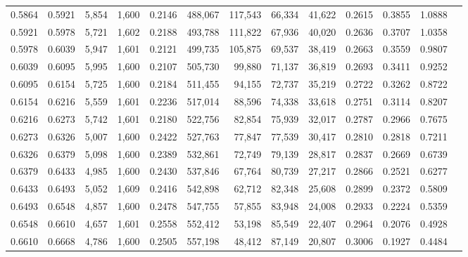 \begin{tabular}{rrrrrrrrrrrrr}
0.5864 & 0.5921 &  5,854 & 1,600 &                                     0.2146 & 488,067 & 117,543 &  66,334 &  41,622 & 0.2615 & 0.3855 & 1.0888 \\
0.5921 & 0.5978 &  5,721 & 1,602 &                                     0.2188 & 493,788 & 111,822 &  67,936 &  40,020 & 0.2636 & 0.3707 & 1.0358 \\
0.5978 & 0.6039 &  5,947 & 1,601 &                                     0.2121 & 499,735 & 105,875 &  69,537 &  38,419 & 0.2663 & 0.3559 & 0.9807 \\
0.6039 & 0.6095 &  5,995 & 1,600 &                                     0.2107 & 505,730 &  99,880 &  71,137 &  36,819 & 0.2693 & 0.3411 & 0.9252 \\
0.6095 & 0.6154 &  5,725 & 1,600 &                                     0.2184 & 511,455 &  94,155 &  72,737 &  35,219 & 0.2722 & 0.3262 & 0.8722 \\
0.6154 & 0.6216 &  5,559 & 1,601 &                                     0.2236 & 517,014 &  88,596 &  74,338 &  33,618 & 0.2751 & 0.3114 & 0.8207 \\
0.6216 & 0.6273 &  5,742 & 1,601 &                                     0.2180 & 522,756 &  82,854 &  75,939 &  32,017 & 0.2787 & 0.2966 & 0.7675 \\
0.6273 & 0.6326 &  5,007 & 1,600 &                                     0.2422 & 527,763 &  77,847 &  77,539 &  30,417 & 0.2810 & 0.2818 & 0.7211 \\
0.6326 & 0.6379 &  5,098 & 1,600 &                                     0.2389 & 532,861 &  72,749 &  79,139 &  28,817 & 0.2837 & 0.2669 & 0.6739 \\
0.6379 & 0.6433 &  4,985 & 1,600 &                                     0.2430 & 537,846 &  67,764 &  80,739 &  27,217 & 0.2866 & 0.2521 & 0.6277 \\
0.6433 & 0.6493 &  5,052 & 1,609 &                                     0.2416 & 542,898 &  62,712 &  82,348 &  25,608 & 0.2899 & 0.2372 & 0.5809 \\
0.6493 & 0.6548 &  4,857 & 1,600 &                                     0.2478 & 547,755 &  57,855 &  83,948 &  24,008 & 0.2933 & 0.2224 & 0.5359 \\
0.6548 & 0.6610 &  4,657 & 1,601 &                                     0.2558 & 552,412 &  53,198 &  85,549 &  22,407 & 0.2964 & 0.2076 & 0.4928 \\
0.6610 & 0.6668 &  4,786 & 1,600 &                                     0.2505 & 557,198 &  48,412 &  87,149 &  20,807 & 0.3006 & 0.1927 & 0.4484 \\

\end{tabular}
